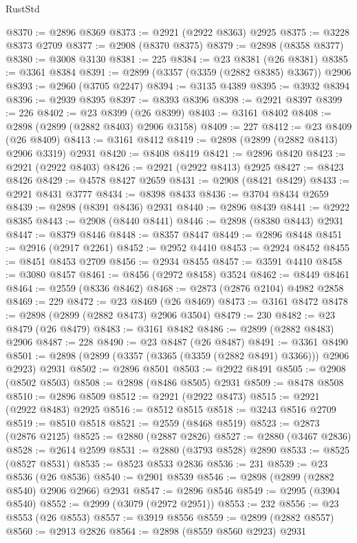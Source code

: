 \begin{lexlean}{RustStd}
\begin{coremodule}
@8370 := @2896 @8369
@8373 := @2921 (@2922 @8363) @2925
@8375 := @3228 @8373 @2709
@8377 := @2908 (@8370 @8375)
@8379 := @2898 (@8358 @8377)
@8380 := @3008 @3130
@8381 := 225
@8384 := @23 @8381 (@26 @8381)
@8385 := @3361 @8384
@8391 := @2899 (@3357 (@3359 (@2882 @8385) @3367)) @2906
@8393 := @2960 (@3705 @2247)
@8394 := @3135 @4389
@8395 := @3932 @8394
@8396 := @2939 @8395
@8397 := @8393 @8396
@8398 := @2921 @8397
@8399 := 226
@8402 := @23 @8399 (@26 @8399)
@8403 := @3161 @8402
@8408 := @2898 (@2899 (@2882 @8403) @2906 @3158)
@8409 := 227
@8412 := @23 @8409 (@26 @8409)
@8413 := @3161 @8412
@8419 := @2898 (@2899 (@2882 @8413) @2906 @3319) @2931
@8420 := @8408 @8419
@8421 := @2896 @8420
@8423 := @2921 (@2922 @8403)
@8426 := @2921 (@2922 @8413) @2925
@8427 := @8423 @8426
@8429 := @4578 @8427 @2659
@8431 := @2908 (@8421 @8429)
@8433 := @2921 @8431 @3777
@8434 := @8398 @8433
@8436 := @3704 @8434 @2659
@8439 := @2898 (@8391 @8436) @2931
@8440 := @2896 @8439
@8441 := @2922 @8385
@8443 := @2908 (@8440 @8441)
@8446 := @2898 (@8380 @8443) @2931
@8447 := @8379 @8446
@8448 := @8357 @8447
@8449 := @2896 @8448
@8451 := @2916 (@2917 @2261)
@8452 := @2952 @4410
@8453 := @2924 @8452
@8455 := @8451 @8453 @2709
@8456 := @2934 @8455
@8457 := @3591 @4410
@8458 := @3080 @8457
@8461 := @8456 (@2972 @8458) @3524
@8462 := @8449 @8461
@8464 := @2559 (@8336 @8462)
@8468 := @2873 (@2876 @2104) @4982 @2858
@8469 := 229
@8472 := @23 @8469 (@26 @8469)
@8473 := @3161 @8472
@8478 := @2898 (@2899 (@2882 @8473) @2906 @3504)
@8479 := 230
@8482 := @23 @8479 (@26 @8479)
@8483 := @3161 @8482
@8486 := @2899 (@2882 @8483) @2906
@8487 := 228
@8490 := @23 @8487 (@26 @8487)
@8491 := @3361 @8490
@8501 := @2898 (@2899 (@3357 (@3365 (@3359 (@2882 @8491) @3366))) @2906 @2923) @2931
@8502 := @2896 @8501
@8503 := @2922 @8491
@8505 := @2908 (@8502 @8503)
@8508 := @2898 (@8486 @8505) @2931
@8509 := @8478 @8508
@8510 := @2896 @8509
@8512 := @2921 (@2922 @8473)
@8515 := @2921 (@2922 @8483) @2925
@8516 := @8512 @8515
@8518 := @3243 @8516 @2709
@8519 := @8510 @8518
@8521 := @2559 (@8468 @8519)
@8523 := @2873 (@2876 @2125)
@8525 := @2880 (@2887 @2826)
@8527 := @2880 (@3467 @2836)
@8528 := @2614 @2599
@8531 := @2880 (@3793 @8528) @2890
@8533 := @8525 (@8527 @8531)
@8535 := @8523 @8533 @2836
@8536 := 231
@8539 := @23 @8536 (@26 @8536)
@8540 := @2901 @8539
@8546 := @2898 (@2899 (@2882 @8540) @2906 @2966) @2931
@8547 := @2896 @8546
@8549 := @2995 (@3904 @8540)
@8552 := @2999 (@3079 (@2972 @2951))
@8553 := 232
@8556 := @23 @8553 (@26 @8553)
@8557 := @3919 @8556
@8559 := @2899 (@2882 @8557)
@8560 := @2913 @2826
@8564 := @2898 (@8559 @8560 @2923) @2931

\end{coremodule}
\end{lexlean}
